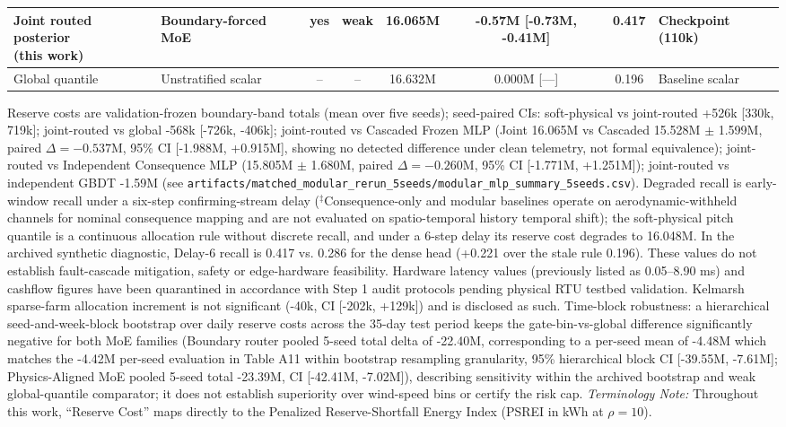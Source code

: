 \documentclass[
  journal]{IEEEtran}
\begin{document}
\begin{table}[!t]
\begin{tabular*}{\textwidth}{@{\extracolsep{\fill}}llcccccl@{}}
\shortstack[l]{Joint routed posterior\\(this work)} & Boundary-forced MoE & yes & weak & 16.065M & -0.57M [-0.73M, -0.41M] & 0.417 & Checkpoint (110k) \\
\midrule
Global quantile & Unstratified scalar & -- & -- & 16.632M & 0.000M [---] & 0.196 & Baseline scalar \\
\bottomrule
\end{tabular*}
\vspace{1mm}
\parbox{\linewidth}{\fontsize{8.0pt}{9.0pt}\selectfont\raggedright Reserve costs are validation-frozen boundary-band totals (mean over five seeds); seed-paired CIs: soft-physical vs joint-routed +526k [330k, 719k]; joint-routed vs global -568k [-726k, -406k]; joint-routed vs Cascaded Frozen MLP (Joint 16.065M vs Cascaded 15.528M $\pm$ 1.599M, paired $\Delta = -0.537\text{M}$, 95\% CI [-1.988M, +0.915M], showing no detected difference under clean telemetry, not formal equivalence); joint-routed vs Independent Consequence MLP (15.805M $\pm$ 1.680M, paired $\Delta = -0.260\text{M}$, 95\% CI [-1.771M, +1.251M]); joint-routed vs independent GBDT -1.59M (see \texttt{artifacts/}\allowbreak\texttt{matched\_modular\_rerun\_5seeds/}\allowbreak\texttt{modular\_mlp\_summary\_5seeds.csv}). Degraded recall is early-window recall under a six-step confirming-stream delay ($^{\ddagger}$Consequence-only and modular baselines operate on aerodynamic-withheld channels for nominal consequence mapping and are not evaluated on spatio-temporal history temporal shift); the soft-physical pitch quantile is a continuous allocation rule without discrete recall, and under a 6-step delay its reserve cost degrades to 16.048M. In the archived synthetic diagnostic, Delay-6 recall is 0.417 vs. 0.286 for the dense head (+0.221 over the stale rule 0.196). These values do not establish fault-cascade mitigation, safety or edge-hardware feasibility. Hardware latency values (previously listed as 0.05--8.90 ms) and cashflow figures have been quarantined in accordance with Step 1 audit protocols pending physical RTU testbed validation. Kelmarsh sparse-farm allocation increment is not significant (-40k, CI [-202k, +129k]) and is disclosed as such. Time-block robustness: a hierarchical seed-and-week-block bootstrap over daily reserve costs across the 35-day test period keeps the gate-bin-vs-global difference significantly negative for both MoE families (Boundary router pooled 5-seed total delta of -22.40M, corresponding to a per-seed mean of -4.48M which matches the -4.42M per-seed evaluation in Table A11 within bootstrap resampling granularity, 95\% hierarchical block CI [-39.55M, -7.61M]; Physics-Aligned MoE pooled 5-seed total -23.39M, CI [-42.41M, -7.02M]), describing sensitivity within the archived bootstrap and weak global-quantile comparator; it does not establish superiority over wind-speed bins or certify the risk cap. \textit{Terminology Note:} Throughout this work, ``Reserve Cost'' maps directly to the Penalized Reserve-Shortfall Energy Index (PSREI in kWh at $\rho=10$).}
\end{table}
\end{document}
